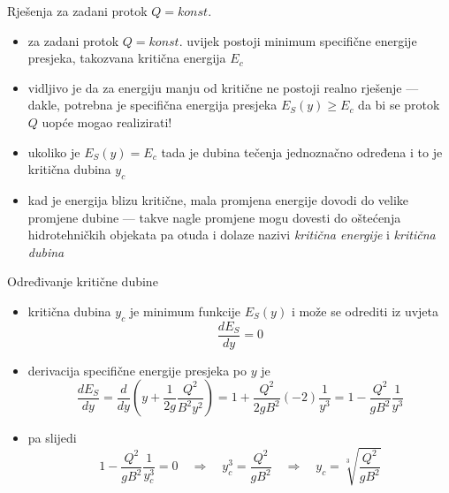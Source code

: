 \documentclass{beamer}
\begin{document}
\begin{frame}{Rješenja za zadani protok $Q=konst.$}

\begin{itemize}
\item za zadani protok $Q=konst.$ uvijek postoji minimum specifične energije
presjeka, takozvana \alert{kritična energija}\emph{ $E_{c}$}
\item vidljivo je da za energiju manju od kritične ne postoji realno rješenje
--- dakle, potrebna je specifična energija presjeka $E_{S}(y)\geq E_{c}$
da bi se protok $Q$ uopće mogao realizirati!
\item ukoliko je $E_{S}(y)=E_{c}$ tada je dubina tečenja jednoznačno određena
i to je \alert{kritična dubina}\emph{ $y_{c}$}
\item kad je energija blizu kritične, mala promjena energije dovodi do velike
promjene dubine --- takve nagle promjene mogu dovesti do oštećenja
hidrotehničkih objekata pa otuda i dolaze nazivi \emph{kritična energije}
i \emph{kritična dubina}
\end{itemize}
\end{frame}

\begin{frame}{Određivanje kritične dubine}

\begin{itemize}
\item kritična dubina $y_{c}$ je minimum funkcije $E_{S}(y)$ i može se
odrediti iz uvjeta
\[
\frac{dE_{S}}{dy}=0
\]
\item derivacija specifične energije presjeka po $y$ je
\[
\frac{dE_{S}}{dy}=\frac{d}{dy}\left(y+\frac{1}{2g}\frac{Q^{2}}{B^{2}y^{2}}\right)=1+\frac{Q^{2}}{2gB^{2}}(-2)\frac{1}{y^{3}}=1-\frac{Q^{2}}{gB^{2}}\frac{1}{y^{3}}
\]
\item pa slijedi
\[
1-\frac{Q^{2}}{gB^{2}}\frac{1}{y_{c}^{3}}=0\quad\Rightarrow\quad y_{c}^{3}=\frac{Q^{2}}{gB^{2}}\quad\Rightarrow\quad y_{c}=\sqrt[3]{\frac{Q^{2}}{gB^{2}}}
\]
\end{itemize}
\end{frame}
\end{document}

